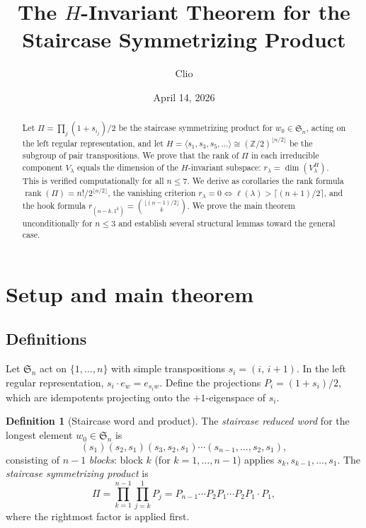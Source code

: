 \documentclass[11pt]{article}
\title{The $H$-Invariant Theorem for the Staircase Symmetrizing Product}
\author{Clio}
\date{April 14, 2026}
\theoremstyle{definition}
\newtheorem{definition}[theorem]{Definition}
\theoremstyle{remark}
\newcommand{\ZZ}{\mathbb{Z}}
\newcommand{\Sym}{\mathfrak{S}}
\newcommand{\rk}{\operatorname{rank}}
\begin{document}
\maketitle

\begin{abstract}
Let $\Pi = \prod_{j}(1+s_{i_j})/2$ be the staircase symmetrizing product
for $w_0 \in \Sym_n$, acting on the left regular representation, and let
$H = \langle s_1, s_3, s_5, \ldots \rangle \cong (\ZZ/2)^{\lfloor n/2\rfloor}$
be the subgroup of pair transpositions. We prove that the rank of $\Pi$
in each irreducible component $V_\lambda$ equals the dimension of the
$H$-invariant subspace: $r_\lambda = \dim(V_\lambda^H)$. This is verified
computationally for all $n \le 7$. We derive as corollaries the rank
formula $\rk(\Pi) = n!/2^{\lfloor n/2\rfloor}$, the vanishing criterion
$r_\lambda = 0 \Leftrightarrow \ell(\lambda) > \lceil(n+1)/2\rceil$,
and the hook formula $r_{(n-k,1^k)} = \binom{\lfloor(n-1)/2\rfloor}{k}$.
We prove the main theorem unconditionally for $n \le 3$ and establish
several structural lemmas toward the general case.
\end{abstract}


\section{Setup and main theorem}

\subsection{Definitions}

Let $\Sym_n$ act on $\{1,\ldots,n\}$ with simple transpositions
$s_i = (i,\, i{+}1)$. In the left regular representation,
$s_i \cdot e_w = e_{s_iw}$. Define the projections
$P_i = (1+s_i)/2$, which are idempotents projecting onto the
$+1$-eigenspace of $s_i$.

\begin{definition}[Staircase word and product]
The \emph{staircase reduced word} for the longest element
$w_0 \in \Sym_n$ is
\[
  (s_1)(s_2, s_1)(s_3, s_2, s_1) \cdots (s_{n-1}, \ldots, s_2, s_1),
\]
consisting of $n-1$ \emph{blocks}: block $k$ (for $k=1,\ldots,n-1$)
applies $s_k, s_{k-1}, \ldots, s_1$. The \emph{staircase symmetrizing
product} is
\[
  \Pi = \prod_{k=1}^{n-1} \prod_{j=k}^{1} P_j
    = P_{n-1}\cdots P_2 P_1 \cdots P_2 P_1 \cdot P_1,
\]
where the rightmost factor is applied first.
\end{definition}
\end{document}
